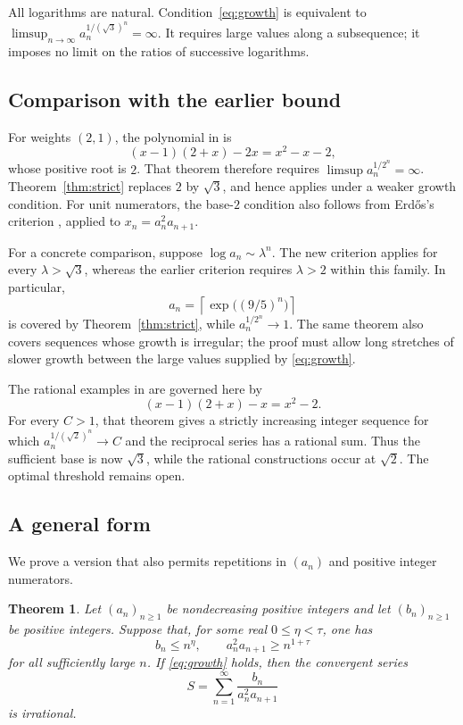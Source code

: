 \documentclass[11pt]{article}
\newtheorem{theorem}{Theorem}[section]
\numberwithin{equation}{section}
\begin{document}
All logarithms are natural. Condition~\eqref{eq:growth} is equivalent
to $\limsup_{n\to\infty}a_n^{1/(\sqrt3)^n}=\infty$. It requires large
values along a subsequence; it imposes no limit on the ratios of
successive logarithms.

\subsection{Comparison with the earlier bound}

For weights $(2,1)$, the polynomial in \cite[Theorem~3]{BKKKZ} is
\[
  (x-1)(2+x)-2x=x^2-x-2,
\]
whose positive root is $2$. That theorem therefore requires
$\limsup a_n^{1/2^n}=\infty$. Theorem~\ref{thm:strict} replaces $2$ by
$\sqrt3$, and hence applies under a weaker growth condition.
For unit numerators, the base-$2$ condition also follows from
Erd\H{o}s's criterion \cite[Theorem~1]{Erdos1975}, applied to
$x_n=a_n^2a_{n+1}$.

For a concrete comparison, suppose $\log a_n\sim\lambda^n$. The new
criterion applies for every $\lambda>\sqrt3$, whereas the earlier
criterion requires $\lambda>2$ within this family. In particular,
\[
  a_n=\left\lceil\exp\bigl((9/5)^n\bigr)\right\rceil
\]
is covered by Theorem~\ref{thm:strict}, while
$a_n^{1/2^n}\to1$. The same theorem also covers sequences whose growth
is irregular; the proof must allow long stretches of slower growth
between the large values supplied by \eqref{eq:growth}.

The rational examples in \cite[Theorem~5]{BKKKZ} are governed here by
\[
  (x-1)(2+x)-x=x^2-2.
\]
For every $C>1$, that theorem gives a strictly increasing integer
sequence for which $a_n^{1/(\sqrt2)^n}\to C$ and the reciprocal series
has a rational sum. Thus the sufficient base is now $\sqrt3$, while
the rational constructions occur at $\sqrt2$. The optimal threshold
remains open.

\subsection{A general form}

We prove a version that also permits repetitions in $(a_n)$ and
positive integer numerators.

\begin{theorem}\label{thm:general}
Let $(a_n)_{n\ge1}$ be nondecreasing positive integers and let
$(b_n)_{n\ge1}$ be positive integers. Suppose that, for some real
$0\le\eta<\tau$, one has
\begin{equation}\label{eq:size}
  b_n\le n^\eta,\qquad a_n^2a_{n+1}\ge n^{1+\tau}
\end{equation}
for all sufficiently large $n$. If \eqref{eq:growth} holds, then the
convergent series
\begin{equation}\label{eq:series}
  S=\sum_{n=1}^{\infty}\frac{b_n}{a_n^2a_{n+1}}
\end{equation}
is irrational.
\end{theorem}
\end{document}
